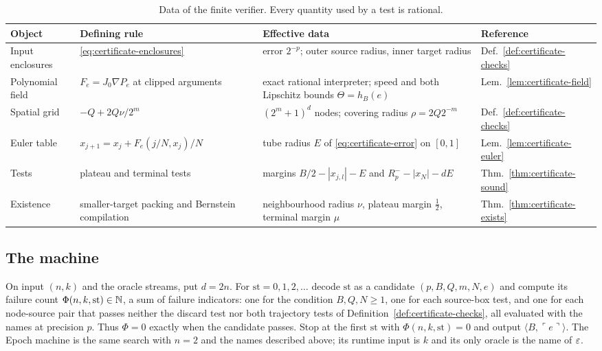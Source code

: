 \begin{table}[ht]
\centering\footnotesize
\begin{tabular}{@{}p{}p{}p{}p{}@{}}
\toprule
Object & Defining rule & Effective data & Reference\\
\midrule
Input enclosures & \eqref{eq:certificate-enclosures} & error $2^{-p}$; outer source radius, inner target radius & Def.~\ref{def:certificate-checks}\\
Polynomial field & $F_e=J_0\nabla P_e$ at clipped arguments & exact rational interpreter; speed and both Lipschitz bounds $\Theta=h_B(e)$ & Lem.~\ref{lem:certificate-field}\\
Spatial grid & $-Q+2Q\nu/2^m$ & $(2^m+1)^d$ nodes; covering radius $\rho=2Q2^{-m}$ & Def.~\ref{def:certificate-checks}\\
Euler table & $x_{j+1}=x_j+F_e(j/N,x_j)/N$ & tube radius $E$ of \eqref{eq:certificate-error} on $[0,1]$ & Lem.~\ref{lem:certificate-euler}\\
Tests & plateau and terminal tests & margins $B/2-|x_{j,l}|-E$ and $R^-_p-|x_N|-dE$ & Thm.~\ref{thm:certificate-sound}\\
Existence & smaller-target packing and Bernstein compilation & neighbourhood radius $\nu$, plateau margin $\frac12$, terminal margin $\mu$ & Thm.~\ref{thm:certificate-exists}\\
\bottomrule
\end{tabular}
\caption{Data of the finite verifier. Every quantity used by a test is rational.}
\label{tab:alg-deps}
\end{table}

\subsection{The machine}

\begin{construction}[Algorithm]\label{cons:alg-main}
On input $(n,k)$ and the oracle streams, put $d=2n$. For $\mathrm{st}=0,1,2,\dots$ decode $\mathrm{st}$ as a candidate
$(p,B,Q,m,N,e)$ and compute its failure count $\Phi(n,k,\mathrm{st})\in\mathbb{N}$, a sum of failure indicators: one for the condition
$B,Q,N\ge1$, one for each source-box test, and one for each node-source pair that passes neither the discard test nor
both trajectory tests of Definition~\ref{def:certificate-checks}, all evaluated with the names at precision $p$. Thus
$\Phi=0$ exactly when the candidate passes. Stop at the first $\mathrm{st}$ with $\Phi(n,k,\mathrm{st})=0$ and output $\langle B,\ulcorner e\urcorner\rangle$.
The Epoch machine is the same search with $n=2$ and the names described above; its runtime input is $k$ and its only
oracle is the name of $\varepsilon$.
\end{construction}

